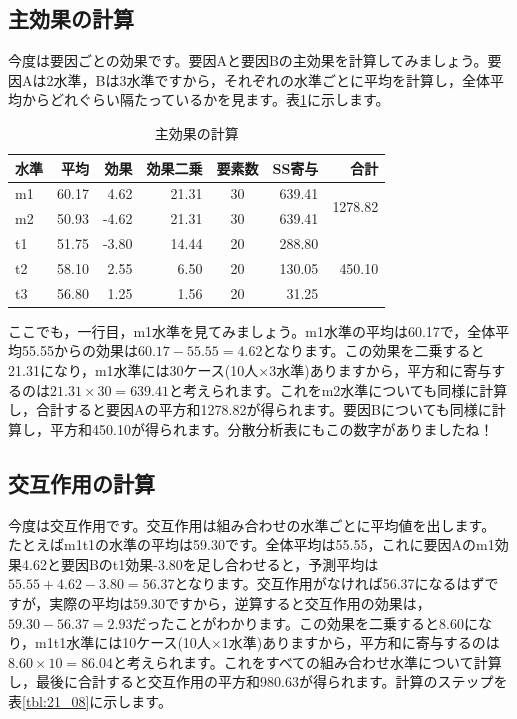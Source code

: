 \documentclass{ltjbook}
\begin{document}
\subsection{主効果の計算}
今度は要因ごとの効果です。要因Aと要因Bの主効果を計算してみましょう。要因Aは2水準，Bは3水準ですから，それぞれの水準ごとに平均を計算し，全体平均からどれぐらい隔たっているかを見ます。表\ref{tbl:21_07}に示します。
\begin{table}[ht]
\centering
\caption{主効果の計算}
\begin{tabular}{lrrrc|r|r}
  \hline
水準 & 平均 & 効果 & 効果二乗 & 要素数 & SS寄与 & 合計\\
  \hline
m1 & 60.17 & 4.62 & 21.31 & 30 & 639.41 & \multirow{2}{*}{1278.82}\\
m2 & 50.93 & -4.62 & 21.31 & 30 & 639.41 & \\\hline
t1 & 51.75 & -3.80 & 14.44 & 20 & 288.80 & \multirow{3}{*}{450.10}\\
t2 & 58.10 & 2.55 & 6.50 & 20 & 130.05 & \\
t3 & 56.80 & 1.25 & 1.56 & 20 & 31.25 & \\\hline
\end{tabular}
\label{tbl:21_07}
\end{table}

ここでも，一行目，m1水準を見てみましょう。m1水準の平均は60.17で，全体平均55.55からの効果は$60.17-55.55=4.62$となります。この効果を二乗すると21.31になり，m1水準には30ケース(10人$\times$3水準)ありますから，平方和に寄与するのは$21.31\times 30=639.41$と考えられます。これをm2水準についても同様に計算し，合計すると要因Aの平方和1278.82が得られます。要因Bについても同様に計算し，平方和450.10が得られます。分散分析表にもこの数字がありましたね！

\subsection{交互作用の計算}
今度は交互作用です。交互作用は組み合わせの水準ごとに平均値を出します。
たとえばm1t1の水準の平均は59.30です。全体平均は55.55，これに要因Aのm1効果4.62と要因Bのt1効果-3.80を足し合わせると，予測平均は$55.55+4.62-3.80=56.37$となります。交互作用がなければ56.37になるはずですが，実際の平均は59.30ですから，逆算すると交互作用の効果は，$59.30-56.37=2.93$だったことがわかります。この効果を二乗すると8.60になり，m1t1水準には10ケース(10人$\times$1水準)ありますから，平方和に寄与するのは$8.60\times 10=86.04$と考えられます。これをすべての組み合わせ水準について計算し，最後に合計すると交互作用の平方和980.63が得られます。計算のステップを表\ref{tbl:21_08}に示します。
\end{document}
